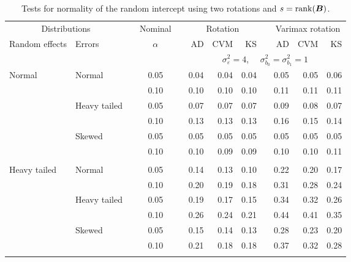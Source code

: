 \begin{table}[ht]
\caption{\label{tab:simb0sB}Tests for normality of the random intercept using two rotations and $s = \operatorname{rank}(\bm{B})$.}
\begin{scriptsize}
\begin{center}
\begin{tabular}{ll p{.1cm} c p{.1cm} rrr p{.1cm} rrr}
  \hline
  \multicolumn{2}{c}{Distributions}& & Nominal & &  \multicolumn{3}{c}{Rotation} & & \multicolumn{3}{c}{Varimax rotation} \\ \cline{1-2} \cline{6-8} \cline{10-12}   
  Random effects & Errors & & $\alpha$ & & AD & CVM & KS & & AD & CVM & KS \\ 
   \hline
& && && \multicolumn{7}{c}{$\sigma_{\varepsilon}^2 = 4$, \ \ $\sigma_{b_0}^2 = \sigma_{b_1}^2 = 1$} \\ \cline{6-12}
\rowcolor{gray!20}Normal       & Normal       && 0.05 &&   0.04 & 0.04 & 0.04 && 0.05 & 0.05 & 0.06 \\ 
\rowcolor{gray!20}             &              && 0.10 &&   0.10 & 0.10 & 0.10 && 0.11 & 0.11 & 0.11 \\ 
\rowcolor{gray!20}             & Heavy tailed && 0.05 &&   0.07 & 0.07 & 0.07 && 0.09 & 0.08 & 0.07 \\ 
\rowcolor{gray!20}             &              && 0.10 &&   0.13 & 0.13 & 0.13 && 0.16 & 0.15 & 0.14 \\ 
\rowcolor{gray!20}             & Skewed       && 0.05 &&   0.05 & 0.05 & 0.05 && 0.05 & 0.05 & 0.05 \\ 
\rowcolor{gray!20}             &              && 0.10 &&   0.10 & 0.09 & 0.09 && 0.10 & 0.10 & 0.11 \\ 
             &&&&&&&&&&&\\
Heavy tailed & Normal       && 0.05 &&   0.14 & 0.13 & 0.10 && 0.22 & 0.20 & 0.17 \\ 
             &              && 0.10 &&   0.20 & 0.19 & 0.18 && 0.31 & 0.28 & 0.24 \\ 
             & Heavy tailed && 0.05 &&   0.19 & 0.17 & 0.15 && 0.34 & 0.32 & 0.26 \\ 
             &              && 0.10 &&   0.26 & 0.24 & 0.21 && 0.44 & 0.41 & 0.35 \\ 
             & Skewed       && 0.05 &&   0.15 & 0.14 & 0.13 && 0.28 & 0.23 & 0.20 \\ 
             &              && 0.10 &&   0.21 & 0.18 & 0.18 && 0.37 & 0.32 & 0.28 \\ 
             &&&&&&&&&&&\\

\end{tabular}
\end{center}
\end{scriptsize}
\end{table}
